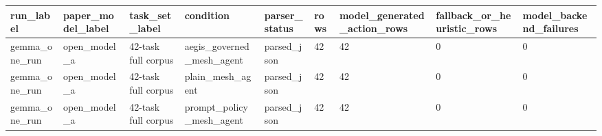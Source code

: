 \begin{tabular}{lllllllll}
 \hline
run\_label & paper\_model\_label & task\_set\_label & condition & parser\_status & rows & model\_generated\_action\_rows & fallback\_or\_heuristic\_rows & model\_backend\_failures \\
 \hline
gemma\_one\_run & open\_model\_a & 42-task full corpus & aegis\_governed\_mesh\_agent & parsed\_json & 42 & 42 & 0 & 0 \\
gemma\_one\_run & open\_model\_a & 42-task full corpus & plain\_mesh\_agent & parsed\_json & 42 & 42 & 0 & 0 \\
gemma\_one\_run & open\_model\_a & 42-task full corpus & prompt\_policy\_mesh\_agent & parsed\_json & 42 & 42 & 0 & 0 \\
 \hline
\end{tabular}

